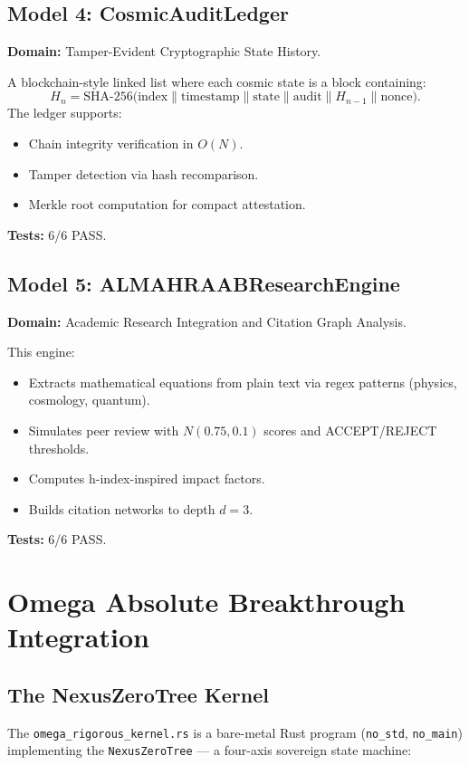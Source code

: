 \documentclass[12pt,a4paper]{article}
\theoremstyle{definition}
\begin{document}
\subsection{Model 4: CosmicAuditLedger}
\textbf{Domain:} Tamper-Evident Cryptographic State History.

A blockchain-style linked list where each cosmic state is a block containing:
\begin{equation}
    H_n = \text{SHA-256}\bigl(\text{index} \| \text{timestamp} \| \text{state} \| \text{audit} \| H_{n-1} \| \text{nonce}\bigr).
\end{equation}
The ledger supports:
\begin{itemize}
    \item Chain integrity verification in $O(N)$.
    \item Tamper detection via hash recomparison.
    \item Merkle root computation for compact attestation.
\end{itemize}
\textbf{Tests:} 6/6 PASS.

\subsection{Model 5: ALMAHRAABResearchEngine}
\textbf{Domain:} Academic Research Integration and Citation Graph Analysis.

This engine:
\begin{itemize}
    \item Extracts mathematical equations from plain text via regex patterns (physics, cosmology, quantum).
    \item Simulates peer review with $N(0.75, 0.1)$ scores and ACCEPT/REJECT thresholds.
    \item Computes h-index-inspired impact factors.
    \item Builds citation networks to depth $d=3$.
\end{itemize}
\textbf{Tests:} 6/6 PASS.

\section{Omega Absolute Breakthrough Integration}

\subsection{The NexusZeroTree Kernel}
The \texttt{omega\_rigorous\_kernel.rs} is a bare-metal Rust program (\texttt{no\_std}, \texttt{no\_main}) implementing the \texttt{NexusZeroTree} — a four-axis sovereign state machine:
\end{document}
